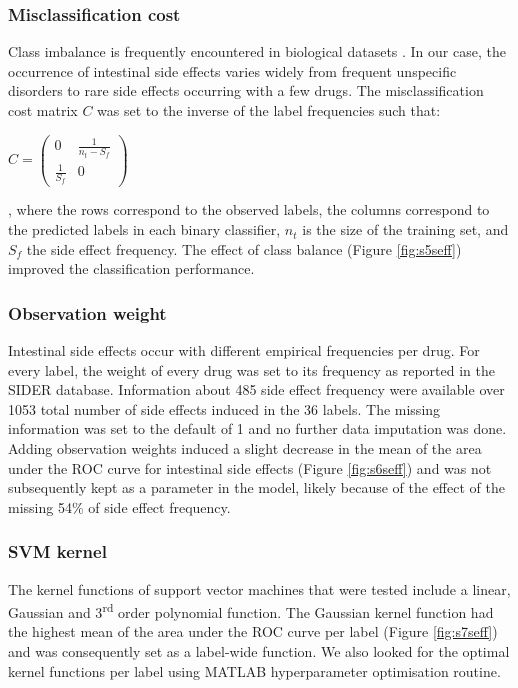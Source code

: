 \subsubsection{Misclassification cost}
Class imbalance is frequently encountered in biological datasets \cite{sontrop2011evaluation,haque2014imbalanced}. In our case, the occurrence of intestinal side effects varies widely from frequent unspecific disorders to rare side effects occurring with a few drugs. The misclassification cost matrix $C$ was set to the inverse of the label frequencies such that:\\
\begin{center}
$ C=
\begin{pmatrix} 
0 & \frac{1}{n_t-S_f} \\
\frac{1}{S_f} & 0 
\end{pmatrix}
$
\end{center}
, where the rows correspond to the observed labels, the columns correspond to the predicted labels in each binary classifier, $n_t$ is the size of the training set, and $S_f$ the side effect frequency. The effect of class balance (Figure \ref{fig:s5seff}) improved the classification performance.
\subsubsection{Observation weight}
Intestinal side effects occur with different empirical frequencies per drug. For every label, the weight of every drug was set to its frequency as reported in the SIDER database. Information about 485 side effect frequency were available over 1053 total number of side effects induced in the 36 labels. The missing information was set to the default of 1 and no further data imputation was done. Adding observation weights induced a slight decrease in the mean of the area under the ROC curve for intestinal side effects (Figure \ref{fig:s6seff}) and was not subsequently kept as a parameter in the model, likely because of the effect of the missing 54\% of side effect frequency.
\subsubsection{SVM kernel}
The kernel functions of support vector machines that were tested include a linear, Gaussian and 3\textsuperscript{rd} order polynomial function. The Gaussian kernel function had the highest mean of the area under the ROC curve per label (Figure \ref{fig:s7seff}) and was consequently set as a label-wide function. We also looked for the optimal kernel functions per label using MATLAB hyperparameter optimisation routine.
